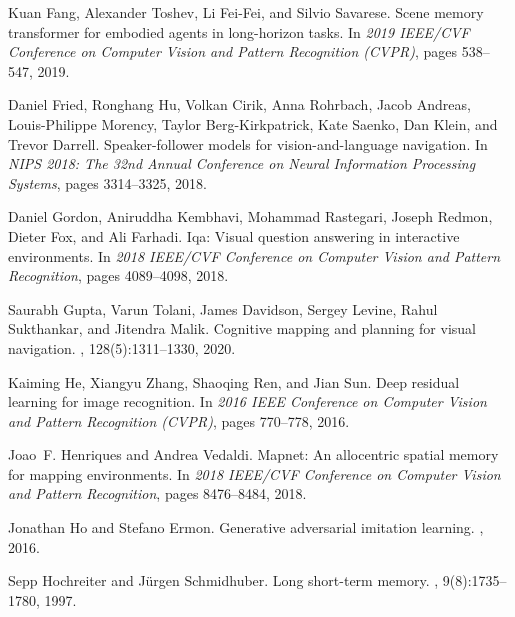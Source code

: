 \documentclass[final]{cvpr}
\begin{document}
\begin{thebibliography}{10}
    Kuan {Fang}, Alexander {Toshev}, Li {Fei-Fei}, and Silvio {Savarese}.
    \newblock Scene memory transformer for embodied agents in long-horizon tasks.
    \newblock In {\em 2019 IEEE/CVF Conference on Computer Vision and Pattern
      Recognition (CVPR)}, pages 538--547, 2019.
    
    Daniel {Fried}, Ronghang {Hu}, Volkan {Cirik}, Anna {Rohrbach}, Jacob
      {Andreas}, Louis-Philippe {Morency}, Taylor {Berg-Kirkpatrick}, Kate
      {Saenko}, Dan {Klein}, and Trevor {Darrell}.
    \newblock Speaker-follower models for vision-and-language navigation.
    \newblock In {\em NIPS 2018: The 32nd Annual Conference on Neural Information
      Processing Systems}, pages 3314--3325, 2018.
    
    Daniel {Gordon}, Aniruddha {Kembhavi}, Mohammad {Rastegari}, Joseph {Redmon},
      Dieter {Fox}, and Ali {Farhadi}.
    \newblock Iqa: Visual question answering in interactive environments.
    \newblock In {\em 2018 IEEE/CVF Conference on Computer Vision and Pattern
      Recognition}, pages 4089--4098, 2018.
    
    Saurabh {Gupta}, Varun {Tolani}, James {Davidson}, Sergey {Levine}, Rahul
      {Sukthankar}, and Jitendra {Malik}.
    \newblock Cognitive mapping and planning for visual navigation.
    , 128(5):1311--1330,
      2020.
    
    Kaiming {He}, Xiangyu {Zhang}, Shaoqing {Ren}, and Jian {Sun}.
    \newblock Deep residual learning for image recognition.
    \newblock In {\em 2016 IEEE Conference on Computer Vision and Pattern
      Recognition (CVPR)}, pages 770--778, 2016.
    
    Joao~F. {Henriques} and Andrea {Vedaldi}.
    \newblock Mapnet: An allocentric spatial memory for mapping environments.
    \newblock In {\em 2018 IEEE/CVF Conference on Computer Vision and Pattern
      Recognition}, pages 8476--8484, 2018.
    
    Jonathan {Ho} and Stefano {Ermon}.
    \newblock Generative adversarial imitation learning.
    , 2016.
    
    Sepp {Hochreiter} and Jürgen {Schmidhuber}.
    \newblock Long short-term memory.
    , 9(8):1735--1780, 1997.
    

\end{thebibliography}
\end{document}
